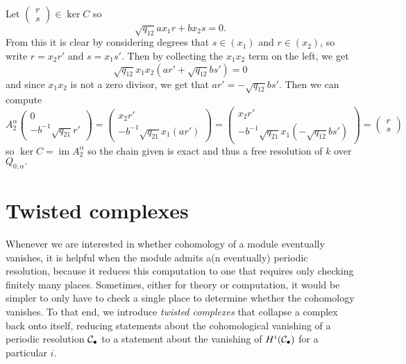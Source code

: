 \documentclass [11pt, proquest] {uwthesis}[2020/02/24]
\begin{document}
\begin{prf}
        Let $(\begin{smallmatrix}
            r\\ s
        \end{smallmatrix})\in\ker C$ so
        \[\sqrt{q_{12}}ax_1r + bx_2s=0.\]
        From this it is clear by considering degrees that $s\in (x_1)$ and $r\in(x_2)$, so write $r=x_2r'$ and $s=x_1s'.$ Then by collecting the $x_1x_2$ term on the left, we get
        \[\sqrt{q_{12}}x_1x_2(ar'+\sqrt{q_{12}}bs')=0\]
        and since $x_1x_2$ is not a zero divisor, we get that $ar'=-\sqrt{q_{12}}bs'.$ Then we can compute
        \[A_2^\alpha\begin{pmatrix}
            0 \\ -b^{-1}\sqrt{q_{21}}r'
        \end{pmatrix}=\begin{pmatrix}
            x_2r' \\ -b^{-1}\sqrt{q_{21}}x_1(ar')
        \end{pmatrix}=\begin{pmatrix}
            x_2r' \\ -b^{-1}\sqrt{q_{21}}x_1(-\sqrt{q_{12}}bs')
        \end{pmatrix}=\begin{pmatrix}
            r \\ s
        \end{pmatrix}\]
        so $\ker C=\operatorname{im} A_2^\alpha$ so the chain given is exact and thus a free resolution of $k$ over $Q_{0,\alpha}.$
    \end{prf}

\section{Twisted complexes}
    Whenever we are interested in whether cohomology of a module eventually vanishes, it is helpful when the module admits a(n eventually) periodic resolution, because it reduces this computation to one that requires only checking finitely many places. Sometimes, either for theory or computation, it would be simpler to only have to check a single place to determine whether the cohomology vanishes. To that end, we introduce \textit{twisted complexes} that collapse a complex back onto itself, reducing statements about the cohomological vanishing of a periodic resolution $\mathcal{C}_\bullet$ to a statement about the vanishing of $H^i(\mathcal{C}_\bullet)$ for a particular $i$.
\end{document}
